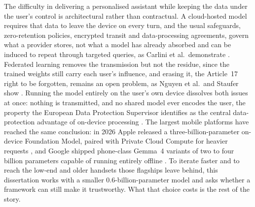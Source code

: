The difficulty in delivering a personalised assistant while keeping the data under the user's control is architectural rather than contractual. A cloud-hosted model requires that data to leave the device on every turn, and the usual safeguards, zero-retention policies, encrypted transit and data-processing agreements, govern what a provider stores, not what a model has already absorbed and can be induced to repeat through targeted queries, as Carlini et al.\ demonstrate \cite{carlini2021extractingtrainingdatalarge}. Federated learning removes the transmission but not the residue, since the trained weights still carry each user's influence, and erasing it, the Article~17 right to be forgotten, remains an open problem, as Nguyen et al.\ and Staufer show \cite{nguyen2026computationcommunicationefficientfederated, staufer2025llmsforgetquantifyingpersonal}. Running the model entirely on the user's own device dissolves both issues at once: nothing is transmitted, and no shared model ever encodes the user, the property the European Data Protection Supervisor identifies as the central data-protection advantage of on-device processing \cite{edps2025ondeviceai}. The largest mobile platforms have reached the same conclusion: in 2026 Apple released a three-billion-parameter on-device Foundation Model, paired with Private Cloud Compute for heavier requests \cite{apple2026afm3}, and Google shipped phone-class Gemma~4 variants of two to four billion parameters capable of running entirely offline \cite{gemma4}. To iterate faster and to reach the low-end and older handsets those flagships leave behind, this dissertation works with a smaller 0.6-billion-parameter model and asks whether a framework can still make it trustworthy. What that choice costs is the rest of the story.

